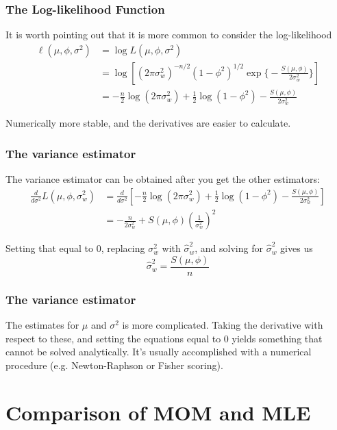 \documentclass[%
xcolor=pdftex]{beamer}
\begin{document}
\begin{frame}
\frametitle{The Log-likelihood Function}

It is worth pointing out that it is more common to consider the log-likelihood
\begin{align*}
\ell(\mu,\phi,\sigma^2) &= \log L(\mu,\phi,\sigma^2) \\
&= \log \left[ (2\pi \sigma^2_w)^{-n/2}(1 - \phi^2)^{1/2} \exp \Big \{ -\frac{ S(\mu,\phi) }{2\sigma^2_w} \Big \} \right] \\
&= -\frac{n}{2} \log (2\pi \sigma^2_w) + \frac{1}{2}\log (1 - \phi^2) -\frac{ S(\mu,\phi) }{2\sigma^2_w} 
\end{align*}

Numerically more stable, and the derivatives are easier to calculate.

\end{frame}


\begin{frame}
\frametitle{The variance estimator}

The variance estimator can be obtained after you get the other estimators:
\begin{align*}
\frac{d}{d\sigma^2}L(\mu,\phi,\sigma^2_w) &= \frac{d}{d\sigma^2}\left[-\frac{n}{2} \log (2\pi \sigma^2_w) + \frac{1}{2}\log (1 - \phi^2) -\frac{ S(\mu,\phi) }{2\sigma^2_w} \right]\\
&= -\frac{n}{2 \sigma^2_w} +  S(\mu,\phi)\left(\frac{1}{\sigma^2_w}\right)^2 
\end{align*}

Setting that equal to $0$, replacing $\sigma^2_w$ with $\hat{\sigma}^2_w$, and solving for $\hat{\sigma}^2_w$ gives us
$$
\hat{\sigma}^2_w = \frac{S(\mu,\phi)}{n}
$$

\end{frame}


\begin{frame}
\frametitle{The variance estimator}

The estimates for $\mu$ and $\sigma^2$ is more complicated. Taking the derivative with respect to these, and setting the equations equal to $0$ yields something that cannot be solved analytically. It's usually accomplished with a numerical procedure (e.g. Newton-Raphson or Fisher scoring).

\end{frame}


\section{Comparison of MOM and MLE}
\frame{\tableofcontents[currentsection]}
\end{document}
